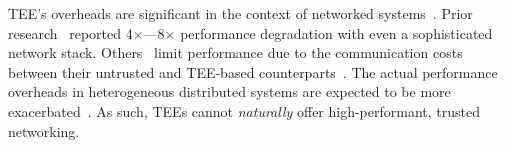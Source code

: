 TEE's overheads are significant in the context of networked systems~\cite{avocado, treaty, minBFT,10.1145/3492321.3519568}. Prior research~\cite{avocado} reported 4$\times$---8$\times$ performance degradation with even a sophisticated network stack. Others~\cite{10.1145/3492321.3519568, hybster, minBFT} limit performance due to the communication costs between their untrusted and TEE-based counterparts~\cite{10.1145/2168836.2168866}. The actual performance overheads in heterogeneous distributed systems are expected to be more exacerbated~\cite{9460547, 9935045}. As such, TEEs cannot {\em naturally} offer high-performant, trusted networking. 

